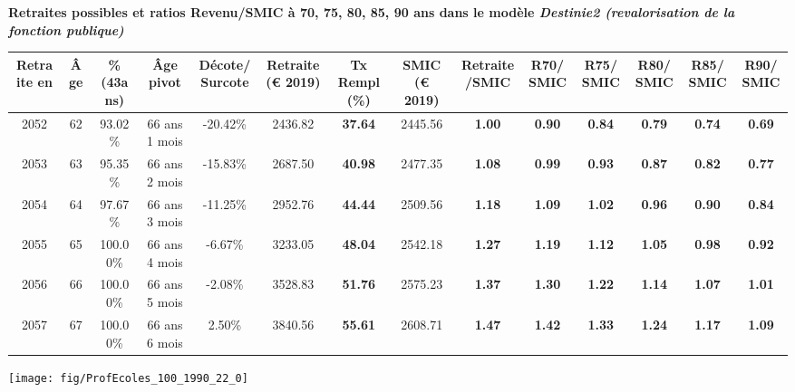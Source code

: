  \vspace{0.1cm} 
{\bf \noindent Retraites possibles et ratios Revenu/SMIC à 70, 75, 80, 85, 90 ans dans le modèle \emph{Destinie2 (revalorisation de la fonction publique)}}  
 
\begin{adjustbox}{max width=\textwidth} 
\begin{tabular}[htb]{|c|c||c|c|c||c|c||c|c||c|c|c|c|c|} 
\hline 
 Retraite en &  Âge &  \%(43ans) &  Âge pivot &  Décote/Surcote &  Retraite (\euro{} 2019) &  Tx Rempl(\%) &  SMIC (\euro{} 2019) &  Retraite/SMIC &  R70/SMIC &  R75/SMIC &  R80/SMIC &  R85/SMIC &  R90/SMIC \\ 
\hline \hline 
 2052 &  62 &  93.02\% &  66 ans 1 mois &  -20.42\% &  2436.82 &  {\bf 37.64} &  2445.56 &  {\bf {\color{red} 1.00}} &  {\bf {\color{red} 0.90}} &  {\bf {\color{red} 0.84}} &  {\bf {\color{red} 0.79}} &  {\bf {\color{red} 0.74}} &  {\bf {\color{red} 0.69}} \\ 
\hline 
 2053 &  63 &  95.35\% &  66 ans 2 mois &  -15.83\% &  2687.50 &  {\bf 40.98} &  2477.35 &  {\bf 1.08} &  {\bf {\color{red} 0.99}} &  {\bf {\color{red} 0.93}} &  {\bf {\color{red} 0.87}} &  {\bf {\color{red} 0.82}} &  {\bf {\color{red} 0.77}} \\ 
\hline 
 2054 &  64 &  97.67\% &  66 ans 3 mois &  -11.25\% &  2952.76 &  {\bf 44.44} &  2509.56 &  {\bf 1.18} &  {\bf 1.09} &  {\bf 1.02} &  {\bf {\color{red} 0.96}} &  {\bf {\color{red} 0.90}} &  {\bf {\color{red} 0.84}} \\ 
\hline 
 2055 &  65 &  100.00\% &  66 ans 4 mois &  -6.67\% &  3233.05 &  {\bf 48.04} &  2542.18 &  {\bf 1.27} &  {\bf 1.19} &  {\bf 1.12} &  {\bf 1.05} &  {\bf {\color{red} 0.98}} &  {\bf {\color{red} 0.92}} \\ 
\hline 
 2056 &  66 &  100.00\% &  66 ans 5 mois &  -2.08\% &  3528.83 &  {\bf 51.76} &  2575.23 &  {\bf 1.37} &  {\bf 1.30} &  {\bf 1.22} &  {\bf 1.14} &  {\bf 1.07} &  {\bf 1.01} \\ 
\hline 
 2057 &  67 &  100.00\% &  66 ans 6 mois &  2.50\% &  3840.56 &  {\bf 55.61} &  2608.71 &  {\bf 1.47} &  {\bf 1.42} &  {\bf 1.33} &  {\bf 1.24} &  {\bf 1.17} &  {\bf 1.09} \\ 
\hline 
\hline 
\end{tabular} 
\end{adjustbox} 
 
 \vspace{0.1cm} 

 {\hspace{-2.2cm}\texttt{[image: fig/ProfEcoles\_100\_1990\_22\_0]}} 

